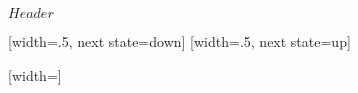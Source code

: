 \ProvidesPackageRCS[v\pgfversion] $Header$

%


\newdimen\pgfsnakesegmentamplitude
\newdimen\pgfsnakesegmentlength
\def\pgfsnakesegmentangle{45}
\def\pgfsnakesegmentobjectlength{\pgfsnakesegmentamplitude}
\def\pgfsnakesegmentaspect{0.5}

\pgfsnakesegmentlength=10pt
\pgfsnakesegmentamplitude=2.5pt








%

{
  [width=.5\pgfsnakesegmentlength,%
             next state=down]
  {
    \pgfpathlineto{\pgfpoint{.25\pgfsnakesegmentlength}{\pgfsnakesegmentamplitude}}
    \pgfpathlineto{\pgfpoint{.5\pgfsnakesegmentlength}{0pt}}
  }
  [width=.5\pgfsnakesegmentlength,%
               next state=up]
  {
    \pgfpathlineto{\pgfpoint{.25\pgfsnakesegmentlength}{-\pgfsnakesegmentamplitude}}
    \pgfpathlineto{\pgfpoint{.5\pgfsnakesegmentlength}{0pt}}
  }
  { \pgfpathlineto{\pgfpoint{\pgfsnakeremainingdistance}{0pt}} }
}



%

{
  [width=\pgfsnakesegmentlength]
  {
    \pgfpathlineto{\pgfpoint{\pgfsnakesegmentlength}{\pgfsnakesegmentamplitude}}
    \pgfpathlineto{\pgfpoint{\pgfsnakesegmentlength}{0pt}}
  }
  {
    \pgfpathlineto{\pgfpoint{\pgfsnakeremainingdistance}{0pt}}
  }
}


%

